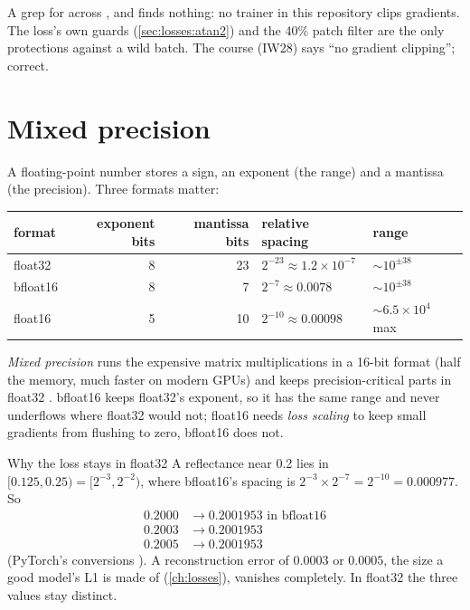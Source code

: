 \begin{sourcenote}[: no clipping]
A grep for  across ,  and  finds
nothing: no trainer in this repository clips gradients. The loss's own guards
(\cref{sec:losses:atan2}) and the 40\% patch filter are the only protections against a wild
batch. The course (IW28) says ``no gradient clipping''; correct.
\end{sourcenote}

\section{Mixed precision}\label{sec:trainloop:precision}

A floating-point number stores a sign, an exponent (the range) and a mantissa (the
precision). Three formats matter:
\begin{center}
\begin{tabular}{lrrll}
\toprule
format & exponent bits & mantissa bits & relative spacing & range\\
\midrule
float32 & 8 & 23 & $2^{-23} \approx 1.2 \times 10^{-7}$ & $\sim 10^{\pm 38}$\\
bfloat16 & 8 & 7 & $2^{-7} \approx 0.0078$ & $\sim 10^{\pm 38}$\\
float16 & 5 & 10 & $2^{-10} \approx 0.00098$ & $\sim 6.5\times 10^{4}$ max\\
\bottomrule
\end{tabular}
\end{center}
\emph{Mixed precision} runs the expensive matrix
multiplications in a 16-bit format (half the memory, much faster on modern GPUs) and keeps
precision-critical parts in float32 \citep{micikevicius2018mixed}. bfloat16 keeps float32's
exponent, so it has the same range and never underflows where float32 would not; float16 needs
\emph{loss scaling} to keep small gradients from flushing to zero, bfloat16 does not.

\begin{worked}[label={we:trainloop:bf16}]{Why the loss stays in float32}
A reflectance near 0.2 lies in $[0.125, 0.25) = [2^{-3}, 2^{-2})$, where bfloat16's spacing is
$2^{-3} \times 2^{-7} = 2^{-10} = 0.000977$. So
\begin{align*}
0.2000 &\to 0.2001953 \text{ in bfloat16}\\
0.2003 &\to 0.2001953\\
0.2005 &\to 0.2001953
\end{align*}
(PyTorch's conversions \tagC). A reconstruction error of $0.0003$ or $0.0005$, the size a good
model's L1 is made of (\cref{ch:losses}), vanishes completely. In float32 the three values stay
distinct.
\end{worked}

